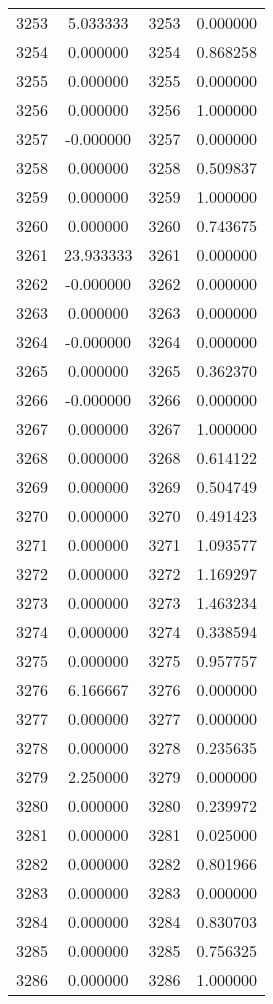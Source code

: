 \documentclass[12pt]{article}
\begin{document}
\begin{longtable}{@{}cccc@{}}
3253 & 5.033333 & 3253 & 0.000000 \\
3254 & 0.000000 & 3254 & 0.868258 \\
3255 & 0.000000 & 3255 & 0.000000 \\
3256 & 0.000000 & 3256 & 1.000000 \\
3257 & -0.000000 & 3257 & 0.000000 \\
3258 & 0.000000 & 3258 & 0.509837 \\
3259 & 0.000000 & 3259 & 1.000000 \\
3260 & 0.000000 & 3260 & 0.743675 \\
3261 & 23.933333 & 3261 & 0.000000 \\
3262 & -0.000000 & 3262 & 0.000000 \\
3263 & 0.000000 & 3263 & 0.000000 \\
3264 & -0.000000 & 3264 & 0.000000 \\
3265 & 0.000000 & 3265 & 0.362370 \\
3266 & -0.000000 & 3266 & 0.000000 \\
3267 & 0.000000 & 3267 & 1.000000 \\
3268 & 0.000000 & 3268 & 0.614122 \\
3269 & 0.000000 & 3269 & 0.504749 \\
3270 & 0.000000 & 3270 & 0.491423 \\
3271 & 0.000000 & 3271 & 1.093577 \\
3272 & 0.000000 & 3272 & 1.169297 \\
3273 & 0.000000 & 3273 & 1.463234 \\
3274 & 0.000000 & 3274 & 0.338594 \\
3275 & 0.000000 & 3275 & 0.957757 \\
3276 & 6.166667 & 3276 & 0.000000 \\
3277 & 0.000000 & 3277 & 0.000000 \\
3278 & 0.000000 & 3278 & 0.235635 \\
3279 & 2.250000 & 3279 & 0.000000 \\
3280 & 0.000000 & 3280 & 0.239972 \\
3281 & 0.000000 & 3281 & 0.025000 \\
3282 & 0.000000 & 3282 & 0.801966 \\
3283 & 0.000000 & 3283 & 0.000000 \\
3284 & 0.000000 & 3284 & 0.830703 \\
3285 & 0.000000 & 3285 & 0.756325 \\
3286 & 0.000000 & 3286 & 1.000000 \\

\end{longtable}
\end{document}
